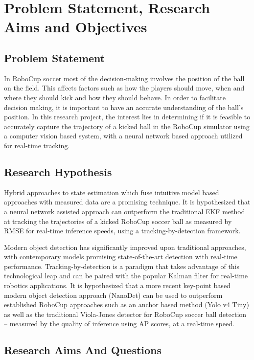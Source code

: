 \documentclass[a4paper,twoside,12pt]{report}
\begin{document}
\chapter{Problem Statement, Research Aims and Objectives}
\section{Problem Statement}

In RoboCup soccer most of the decision-making involves the position of the ball on the field. This affects factors such as how the players should move, when and where they should kick and how they should behave. In order to facilitate decision making, it is important to have an accurate understanding of the ball’s position. In this research project, the interest lies in determining if it is feasible to accurately capture the trajectory of a kicked ball in the RoboCup simulator using a computer vision based system, with a neural network based approach utilized for real-time tracking.

\section{Research Hypothesis}

Hybrid approaches to state estimation which fuse intuitive model based approaches with measured data are a promising technique. It is hypothesized that a neural network assisted approach can outperform the traditional EKF method at tracking the trajectories of a kicked RoboCup soccer ball as measured by RMSE for real-time inference speeds, using a tracking-by-detection framework.

Modern object detection has significantly improved upon traditional approaches, with contemporary models promising state-of-the-art detection with real-time performance. Tracking-by-detection is a paradigm that takes advantage of this technological leap and can be paired with the popular Kalman filter for real-time robotics applications. It is hypothesized that a more recent key-point based modern object detection approach (NanoDet) can be used to outperform established RoboCup approaches such as an anchor based method (Yolo v4 Tiny) as well as the traditional Viola-Jones detector for RoboCup soccer ball detection -- measured by the quality of inference using AP scores, at a real-time speed. 

\section{Research Aims And Questions}
\end{document}
